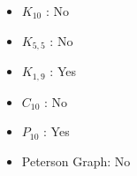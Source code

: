 \documentclass[12pt]{article}
\begin{document}
\begin{itemize}
\item $K_{10}$ \hspace{3mm}: No
\item $K_{5,5}$ \hspace{2mm}: No
\item $K_{1,9}$ \hspace{2mm}: Yes
\item $C_{10}$ \hspace{3mm}: No
\item $P_{10}$ \hspace{3mm}: Yes
\item Peterson Graph: No
\end{itemize}

\begin{align*}
\end{align*}

\end{document}
